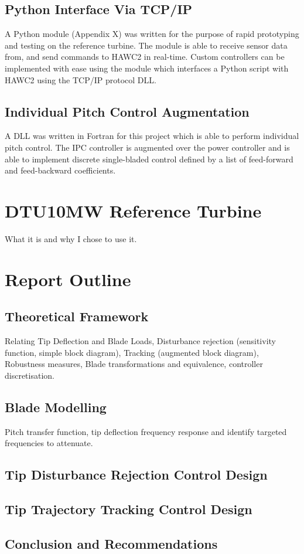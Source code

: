 \subsection*{Python Interface Via TCP/IP}
A Python module (Appendix X) was written for the purpose of rapid prototyping and testing on the reference turbine. The module is able to receive sensor data from, and send commands to HAWC2 in real-time. Custom controllers can be implemented with ease using the module which interfaces a Python script with HAWC2 using the TCP/IP protocol DLL.
\subsection{Individual Pitch Control Augmentation}
A DLL was written in Fortran for this project which is able to perform individual pitch control. The IPC controller is augmented over the power controller and is able to implement discrete single-bladed control defined by a list of feed-forward and feed-backward coefficients. 

\section{DTU10MW Reference Turbine}
What it is and why I chose to use it.





\section{Report Outline}

\subsection*{Theoretical Framework}
Relating Tip Deflection and Blade Loads, Disturbance rejection (sensitivity function, simple block diagram), Tracking (augmented block diagram), Robustness measures, Blade transformations and equivalence, controller discretisation.
\subsection*{Blade Modelling}
Pitch transfer function, tip deflection frequency response and identify targeted frequencies to attenuate.


\subsection*{Tip Disturbance Rejection Control Design}

\subsection*{Tip Trajectory Tracking Control Design}
\subsection*{Conclusion and Recommendations}
